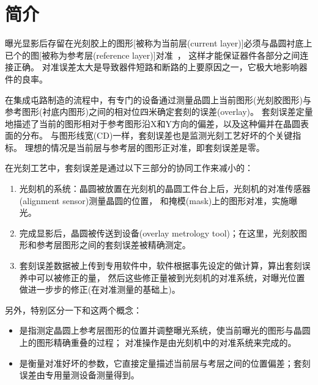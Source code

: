 
\newpage

\section{简介~\label{简介}}
曝光显影后存留在光刻胶上的图形[被称为当前层(current layer)]必须与晶圆衬底上已个的图[被称为参考层(reference layer)]对准~\cite{yayi2016super}，
这样才能保证器件各部分之间连接正确。
对准误差太大是导致器件短路和断路的上要原因之一，它极大地影响器件的良率。

在集成屯路制造的流程中，有专门的设备通过测量品圆上当前图形(光刻胶图形)与参考图形(衬底内图形)之间的相对位四米确定套刻的误差(overlay)。
套刻误差定量地描述了当前的图形相对于参考图形沿X和Y方向的偏差，以及这种偏并在晶圆表面的分布。
与图形线宽(CD)一样，套刻误差也是监测光刻工艺好坏的个关键指标。
理想的情况是当前层与参考层的图形正对准，即套刻误差是零。

在光刻工艺中，套刻误差是通过以下三部分的协同工作来减小的：
\begin{enumerate}[leftmargin=*] 
\setlength{\itemsep}{2pt}
\setlength{\parsep}{0pt}
\setlength{\parskip}{0pt}
\item 光刻机的系统：晶圆被放置在光刻机的晶圆工件台上后，光刻机的对准传感器(alignment sensor)测量晶圆的位置，
和掩模(mask)上的图形对准，实施曝光。
\item 完成显影后，晶圆被传送到设备(overlay metrology tool)；在这里，光刻胶图形和参考层图形之间的套刻误差被精确测定。
\item 套刻误差数据被上传到专用软件中，软件根据事先设定的做计算，算出套刻误养中可以被修正的量，
然后这些修正量被到光刻机的对准系统，对曝光位置做进一步步的修正(在对准测量的基础上)。
\end{enumerate}
另外，特别区分一下和这两个概念：
\begin{itemize}[leftmargin=*] 
\setlength{\itemsep}{2pt}
\setlength{\parsep}{0pt}
\setlength{\parskip}{0pt}
\item {}是指测定晶圆上参考层图形的位置并调整曝光系统，使当前曝光的图形与晶圆上的图形精确重叠的过程；
对准操作是由光刻机中的对准系统来完成的。
\item {}是衡量对准好坏的参数，它直接定量描述当前层与考层之间的位置偏差；套刻误差由专用量测设备测量得到。
\end{itemize}

